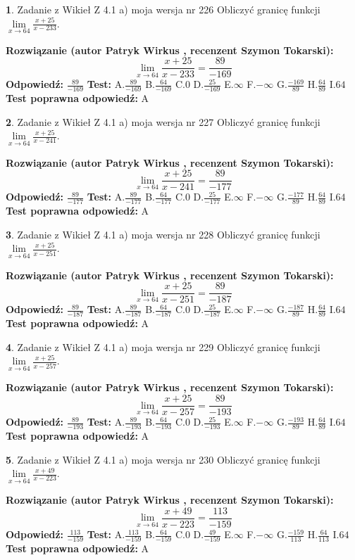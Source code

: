 \documentclass[12pt, a4paper]{article}
\theoremstyle{definition} %
\newtheorem{zad}{}
\newcommand{\zadStart}[1]{\begin{zad}#1\newline}
\newcommand{\zadStop}{\end{zad}}
\newcommand{\rozwStart}[2]{\noindent \textbf{Rozwiązanie (autor #1 , recenzent #2): }\newline}
\newcommand{\rozwStop}{\newline}
\newcommand{\odpStart}{\noindent \textbf{Odpowiedź:}\newline}
\newcommand{\odpStop}{\newline}
\newcommand{\testStart}{\noindent \textbf{Test:}\newline}
\newcommand{\testStop}{\newline}
\newcommand{\kluczStart}{\noindent \textbf{Test poprawna odpowiedź:}\newline}
\newcommand{\kluczStop}{\newline}
\begin{document}
\zadStart{Zadanie z Wikieł Z 4.1 a) moja wersja nr 226}
Obliczyć granicę funkcji $\lim\limits_{x\to64}\frac{x+25}{x-233}$.
\zadStop
\rozwStart{Patryk Wirkus}{Szymon Tokarski}
$$\lim\limits_{x\to64}\frac{x+25}{x-233} = \frac{89}{-169}$$
\rozwStop
\odpStart
$\frac{89}{-169}$
\odpStop
\testStart
A.$\frac{89}{-169}$
B.$\frac{64}{-169}$
C.$0$
D.$\frac{25}{-169}$
E.$\infty$
F.$-\infty$
G.$\frac{-169}{89}$
H.$\frac{64}{89}$
I.$64$
\testStop
\kluczStart
A
\kluczStop



\zadStart{Zadanie z Wikieł Z 4.1 a) moja wersja nr 227}
Obliczyć granicę funkcji $\lim\limits_{x\to64}\frac{x+25}{x-241}$.
\zadStop
\rozwStart{Patryk Wirkus}{Szymon Tokarski}
$$\lim\limits_{x\to64}\frac{x+25}{x-241} = \frac{89}{-177}$$
\rozwStop
\odpStart
$\frac{89}{-177}$
\odpStop
\testStart
A.$\frac{89}{-177}$
B.$\frac{64}{-177}$
C.$0$
D.$\frac{25}{-177}$
E.$\infty$
F.$-\infty$
G.$\frac{-177}{89}$
H.$\frac{64}{89}$
I.$64$
\testStop
\kluczStart
A
\kluczStop



\zadStart{Zadanie z Wikieł Z 4.1 a) moja wersja nr 228}
Obliczyć granicę funkcji $\lim\limits_{x\to64}\frac{x+25}{x-251}$.
\zadStop
\rozwStart{Patryk Wirkus}{Szymon Tokarski}
$$\lim\limits_{x\to64}\frac{x+25}{x-251} = \frac{89}{-187}$$
\rozwStop
\odpStart
$\frac{89}{-187}$
\odpStop
\testStart
A.$\frac{89}{-187}$
B.$\frac{64}{-187}$
C.$0$
D.$\frac{25}{-187}$
E.$\infty$
F.$-\infty$
G.$\frac{-187}{89}$
H.$\frac{64}{89}$
I.$64$
\testStop
\kluczStart
A
\kluczStop



\zadStart{Zadanie z Wikieł Z 4.1 a) moja wersja nr 229}
Obliczyć granicę funkcji $\lim\limits_{x\to64}\frac{x+25}{x-257}$.
\zadStop
\rozwStart{Patryk Wirkus}{Szymon Tokarski}
$$\lim\limits_{x\to64}\frac{x+25}{x-257} = \frac{89}{-193}$$
\rozwStop
\odpStart
$\frac{89}{-193}$
\odpStop
\testStart
A.$\frac{89}{-193}$
B.$\frac{64}{-193}$
C.$0$
D.$\frac{25}{-193}$
E.$\infty$
F.$-\infty$
G.$\frac{-193}{89}$
H.$\frac{64}{89}$
I.$64$
\testStop
\kluczStart
A
\kluczStop



\zadStart{Zadanie z Wikieł Z 4.1 a) moja wersja nr 230}
Obliczyć granicę funkcji $\lim\limits_{x\to64}\frac{x+49}{x-223}$.
\zadStop
\rozwStart{Patryk Wirkus}{Szymon Tokarski}
$$\lim\limits_{x\to64}\frac{x+49}{x-223} = \frac{113}{-159}$$
\rozwStop
\odpStart
$\frac{113}{-159}$
\odpStop
\testStart
A.$\frac{113}{-159}$
B.$\frac{64}{-159}$
C.$0$
D.$\frac{49}{-159}$
E.$\infty$
F.$-\infty$
G.$\frac{-159}{113}$
H.$\frac{64}{113}$
I.$64$
\testStop
\kluczStart
A
\kluczStop
\end{document}
